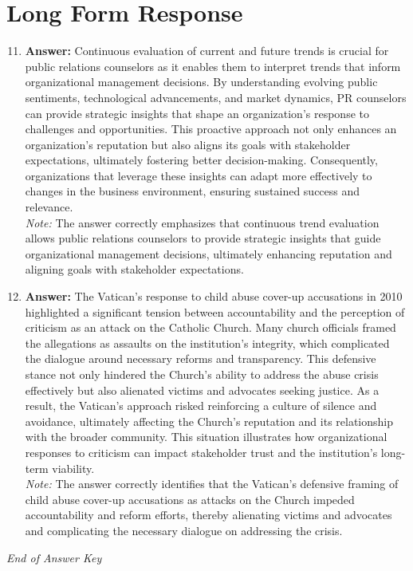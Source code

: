 \documentclass[12pt]{article}
\begin{document}
\section*{Long Form Response}
\begin{enumerate}[label=\arabic*.]
\setcounter{enumi}{10}
\item \textbf{Answer:} Continuous evaluation of current and future trends is crucial for public relations counselors as it enables them to interpret trends that inform organizational management decisions. By understanding evolving public sentiments, technological advancements, and market dynamics, PR counselors can provide strategic insights that shape an organization's response to challenges and opportunities. This proactive approach not only enhances an organization's reputation but also aligns its goals with stakeholder expectations, ultimately fostering better decision-making. Consequently, organizations that leverage these insights can adapt more effectively to changes in the business environment, ensuring sustained success and relevance.
\\ \textit{Note:} The answer correctly emphasizes that continuous trend evaluation allows public relations counselors to provide strategic insights that guide organizational management decisions, ultimately enhancing reputation and aligning goals with stakeholder expectations.
\item \textbf{Answer:} The Vatican's response to child abuse cover-up accusations in 2010 highlighted a significant tension between accountability and the perception of criticism as an attack on the Catholic Church. Many church officials framed the allegations as assaults on the institution's integrity, which complicated the dialogue around necessary reforms and transparency. This defensive stance not only hindered the Church's ability to address the abuse crisis effectively but also alienated victims and advocates seeking justice. As a result, the Vatican's approach risked reinforcing a culture of silence and avoidance, ultimately affecting the Church's reputation and its relationship with the broader community. This situation illustrates how organizational responses to criticism can impact stakeholder trust and the institution's long-term viability.
\\ \textit{Note:} The answer correctly identifies that the Vatican's defensive framing of child abuse cover-up accusations as attacks on the Church impeded accountability and reform efforts, thereby alienating victims and advocates and complicating the necessary dialogue on addressing the crisis.
\end{enumerate}

\vfill
\noindent\textit{End of Answer Key}
\end{document}
